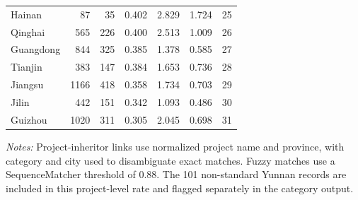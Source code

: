 \begin{table}[!htbp]
{\begin{tabular}{lrrrrrr}
Hainan & 87 & 35 & 0.402 & 2.829 & 1.724 & 25 \\
Qinghai & 565 & 226 & 0.400 & 2.513 & 1.009 & 26 \\
Guangdong & 844 & 325 & 0.385 & 1.378 & 0.585 & 27 \\
Tianjin & 383 & 147 & 0.384 & 1.653 & 0.736 & 28 \\
Jiangsu & 1166 & 418 & 0.358 & 1.734 & 0.703 & 29 \\
Jilin & 442 & 151 & 0.342 & 1.093 & 0.486 & 30 \\
Guizhou & 1020 & 311 & 0.305 & 2.045 & 0.698 & 31 \\
\bottomrule
\end{tabular}
}
\begin{minipage}{0.96\textwidth}
\footnotesize \textit{Notes:} Project-inheritor links use normalized project name and province, with category and city used to disambiguate exact matches. Fuzzy matches use a SequenceMatcher threshold of 0.88. The 101 non-standard Yunnan records are included in this project-level rate and flagged separately in the category output.
\end{minipage}
\end{table}
